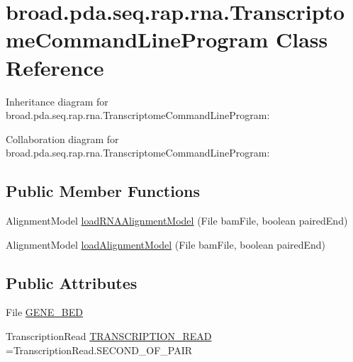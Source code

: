 \hypertarget{classbroad_1_1pda_1_1seq_1_1rap_1_1rna_1_1_transcriptome_command_line_program}{\section{broad.\+pda.\+seq.\+rap.\+rna.\+Transcriptome\+Command\+Line\+Program Class Reference}
\label{classbroad_1_1pda_1_1seq_1_1rap_1_1rna_1_1_transcriptome_command_line_program}
}


Inheritance diagram for broad.\+pda.\+seq.\+rap.\+rna.\+Transcriptome\+Command\+Line\+Program\+:


Collaboration diagram for broad.\+pda.\+seq.\+rap.\+rna.\+Transcriptome\+Command\+Line\+Program\+:
\subsection*{Public Member Functions}
\begin{DoxyCompactItemize}
\item 
Alignment\+Model \hyperlink{classbroad_1_1pda_1_1seq_1_1rap_1_1rna_1_1_transcriptome_command_line_program_add0cdd3b186b1f7c6e2dbb55eac72a37}{load\+R\+N\+A\+Alignment\+Model} (File bam\+File, boolean paired\+End)
\item 
Alignment\+Model \hyperlink{classbroad_1_1pda_1_1seq_1_1rap_1_1rna_1_1_transcriptome_command_line_program_a380066c1ae8e8f10bcc3a003a7d1fc15}{load\+Alignment\+Model} (File bam\+File, boolean paired\+End)
\end{DoxyCompactItemize}
\subsection*{Public Attributes}
\begin{DoxyCompactItemize}
\item 
File \hyperlink{classbroad_1_1pda_1_1seq_1_1rap_1_1rna_1_1_transcriptome_command_line_program_a4f25520daa1a78a924387bb781d17ca9}{G\+E\+N\+E\+\_\+\+B\+E\+D}
\item 
Transcription\+Read \hyperlink{classbroad_1_1pda_1_1seq_1_1rap_1_1rna_1_1_transcriptome_command_line_program_a478391ce7a4a11b11bda0da29410eb29}{T\+R\+A\+N\+S\+C\+R\+I\+P\+T\+I\+O\+N\+\_\+\+R\+E\+A\+D} =Transcription\+Read.\+S\+E\+C\+O\+N\+D\+\_\+\+O\+F\+\_\+\+P\+A\+I\+R
\end{DoxyCompactItemize}
